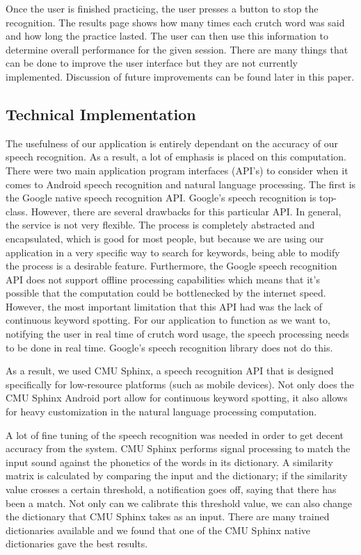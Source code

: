\documentclass{sigchi}
\begin{document}
Once the user is finished practicing, the user presses a button to stop the recognition. The results page shows how many times each crutch word was said and how long the practice lasted. The user can then use this information to determine overall performance for the given session. There are many things that can be done to improve the user interface but they are not currently implemented. Discussion of future improvements can be found later in this paper.

\subsection{Technical Implementation}

The usefulness of our application is entirely dependant on the accuracy of our speech recognition. As a result, a lot of emphasis is placed on this computation. There were two main application program interfaces (API’s) to consider when it comes to Android speech recognition and natural language processing. The first is the Google native speech recognition API. Google’s speech recognition is top-class. However, there are several drawbacks for this particular API. In general, the service is not very flexible. The process is completely abstracted and encapsulated, which is good for most people, but because we are using our application in a very specific way to search for keywords, being able to modify the process is a desirable feature. Furthermore, the Google speech recognition API does not support offline processing capabilities which means that it’s possible that the computation could be bottlenecked by the internet speed. However, the most important limitation that this API had was the lack of continuous keyword spotting. For our application to function as we want to, notifying the user in real time of crutch word usage, the speech processing needs to be done in real time. Google’s speech recognition library does not do this. 

As a result, we used CMU Sphinx, a speech recognition API that is designed specifically for low-resource platforms (such as mobile devices). Not only does the CMU Sphinx Android port allow for continuous keyword spotting, it also allows for heavy customization in the natural language processing computation. 

A lot of fine tuning of the speech recognition was needed in order to get decent accuracy from the system. CMU Sphinx performs signal processing to match the input sound against the phonetics of the words in its dictionary. A similarity matrix is calculated by comparing the input and the dictionary; if the similarity value crosses a certain threshold, a notification goes off, saying that there has been a match. Not only can we calibrate this threshold value, we can also change the dictionary that CMU Sphinx takes as an input. There are many trained dictionaries available and we found that one of the CMU Sphinx native dictionaries gave the best results.
\end{document}
